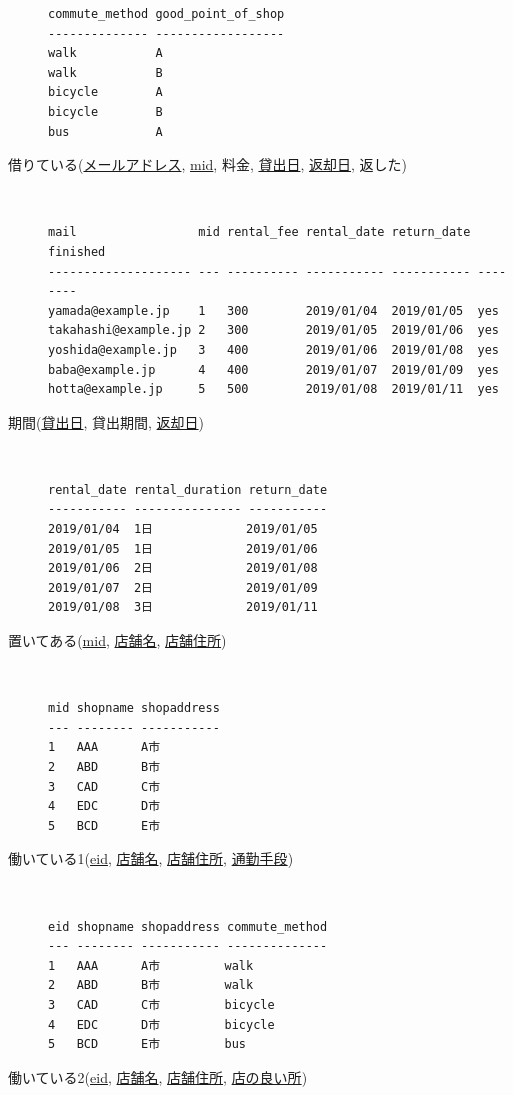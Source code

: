 \documentclass{jarticle}
\begin{document}
\begin{description}
\begin{verbatim}
commute_method good_point_of_shop
-------------- ------------------
walk           A
walk           B
bicycle        A
bicycle        B
bus            A
\end{verbatim}
\item[借りている(\underline{メールアドレス}, \underline{mid}, 料金, \underline{貸出日}, \underline{返却日}, 返した)] \leavevmode \\
\begin{verbatim}
mail                 mid rental_fee rental_date return_date finished
-------------------- --- ---------- ----------- ----------- --------
yamada@example.jp    1   300        2019/01/04  2019/01/05  yes
takahashi@example.jp 2   300        2019/01/05  2019/01/06  yes
yoshida@example.jp   3   400        2019/01/06  2019/01/08  yes
baba@example.jp      4   400        2019/01/07  2019/01/09  yes
hotta@example.jp     5   500        2019/01/08  2019/01/11  yes
\end{verbatim}
\item[期間(\underline{貸出日}, 貸出期間, \underline{返却日})] \leavevmode \\
\begin{verbatim}
rental_date rental_duration return_date
----------- --------------- -----------
2019/01/04  1日             2019/01/05
2019/01/05  1日             2019/01/06
2019/01/06  2日             2019/01/08
2019/01/07  2日             2019/01/09
2019/01/08  3日             2019/01/11
\end{verbatim}
\item[置いてある(\underline{mid}, \underline{店舗名}, \underline{店舗住所})] \leavevmode \\
\begin{verbatim}
mid shopname shopaddress
--- -------- -----------
1   AAA      A市
2   ABD      B市
3   CAD      C市
4   EDC      D市
5   BCD      E市
\end{verbatim}
\item[働いている1(\underline{eid}, \underline{店舗名}, \underline{店舗住所}, \underline{通勤手段})] \leavevmode \\
\begin{verbatim}
eid shopname shopaddress commute_method
--- -------- ----------- --------------
1   AAA      A市         walk
2   ABD      B市         walk
3   CAD      C市         bicycle
4   EDC      D市         bicycle
5   BCD      E市         bus
\end{verbatim}
\item[働いている2(\underline{eid}, \underline{店舗名}, \underline{店舗住所}, \underline{店の良い所})] \leavevmode \\

\end{description}
\end{document}
